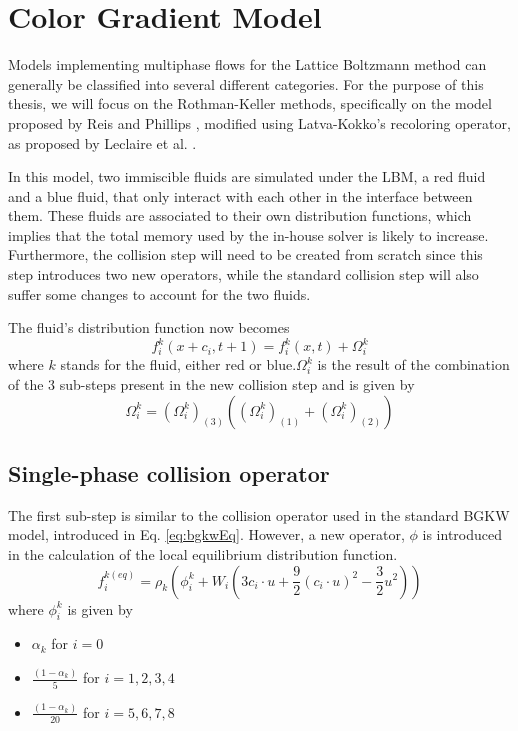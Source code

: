\documentclass[12pt, openany]{book}
\begin{document}
\section{Color Gradient Model}\label{sec:cgModel}
Models implementing multiphase flows for the Lattice Boltzmann method can generally be classified into several different categories. For the purpose of this thesis, we will focus on the Rothman-Keller methods, specifically on the model proposed by Reis and Phillips \cite{reisPhil}, modified using Latva-Kokko's recoloring operator, as proposed by Leclaire et al. \cite{leclaire3}. \par
In this model, two immiscible fluids are simulated under the LBM, a red fluid and a blue fluid, that only interact with each other in the interface between them. These fluids are associated to their own distribution functions, which implies that the total memory used by the in-house solver is likely to increase. Furthermore, the collision step will need to be created from scratch since this step introduces two new operators, while the standard collision step will also suffer some changes to account for the two fluids. \par
The fluid's distribution function now becomes
\begin{equation}\label{eq:cgDistrib}
f_{i}^{k}\left(x+c_i, t+1\right) = f_{i}^{k}\left(x,t\right) + \Omega_i^{k}
\end{equation}
where $k$ stands for the fluid, either red or blue.$\Omega_i^{k}$ is the result of the combination of the 3 sub-steps present in the new collision step and is given by
\begin{equation}\label{eq:cgColl}
\Omega_i^{k} = \left(\Omega_i^{k}\right)_{\left(3\right)} \left(\left(\Omega_i^{k}\right)_{\left(1\right)} + \left(\Omega_i^{k}\right)_{\left(2\right)}\right)
\end{equation}
\subsection{Single-phase collision operator}
The first sub-step is similar to the collision operator used in the standard BGKW model, introduced in Eq. \ref{eq:bgkwEq}. However, a new operator, $\phi$ is introduced in the calculation of the local equilibrium distribution function. 
\begin{equation}\label{eq:newFEQ}
f_i^{k\left(eq\right)} = \rho_k\left(\phi_i^k + W_i\left(3c_i \cdot u + \frac{9}{2}\left(c_i \cdot u\right)^2 - \frac{3}{2}u^2 \right)\right)
\end{equation}
where $\phi_i^k$ is given by 
\begin{itemize}
	\item $\alpha_k$ for $i = 0$
	\item $\frac{\left(1-\alpha_k\right)}{5}$ for $i = {1,2,3,4}$
	\item $\frac{\left(1-\alpha_k\right)}{20}$ for $i = {5,6,7,8}$
\end{itemize}
\end{document}
